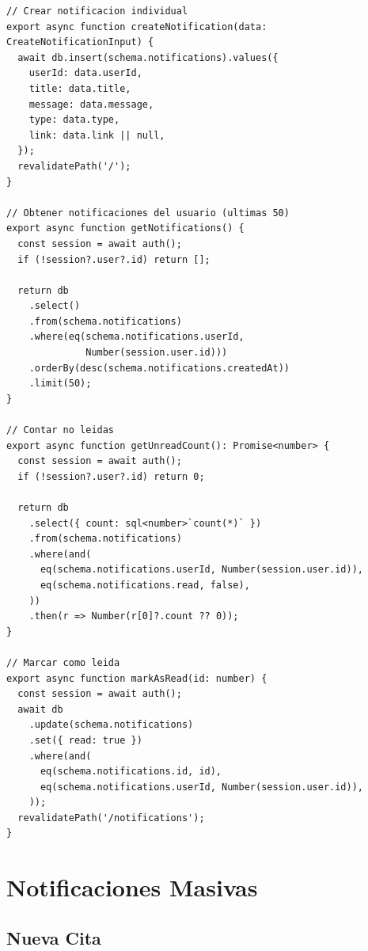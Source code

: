 \begin{lstlisting}[style=typescript, caption=Notificaciones - Acciones principales]
// Crear notificacion individual
export async function createNotification(data: CreateNotificationInput) {
  await db.insert(schema.notifications).values({
    userId: data.userId,
    title: data.title,
    message: data.message,
    type: data.type,
    link: data.link || null,
  });
  revalidatePath('/');
}

// Obtener notificaciones del usuario (ultimas 50)
export async function getNotifications() {
  const session = await auth();
  if (!session?.user?.id) return [];

  return db
    .select()
    .from(schema.notifications)
    .where(eq(schema.notifications.userId,
              Number(session.user.id)))
    .orderBy(desc(schema.notifications.createdAt))
    .limit(50);
}

// Contar no leidas
export async function getUnreadCount(): Promise<number> {
  const session = await auth();
  if (!session?.user?.id) return 0;

  return db
    .select({ count: sql<number>`count(*)` })
    .from(schema.notifications)
    .where(and(
      eq(schema.notifications.userId, Number(session.user.id)),
      eq(schema.notifications.read, false),
    ))
    .then(r => Number(r[0]?.count ?? 0));
}

// Marcar como leida
export async function markAsRead(id: number) {
  const session = await auth();
  await db
    .update(schema.notifications)
    .set({ read: true })
    .where(and(
      eq(schema.notifications.id, id),
      eq(schema.notifications.userId, Number(session.user.id)),
    ));
  revalidatePath('/notifications');
}
\end{lstlisting}

\section{Notificaciones Masivas}

\subsection{Nueva Cita}

